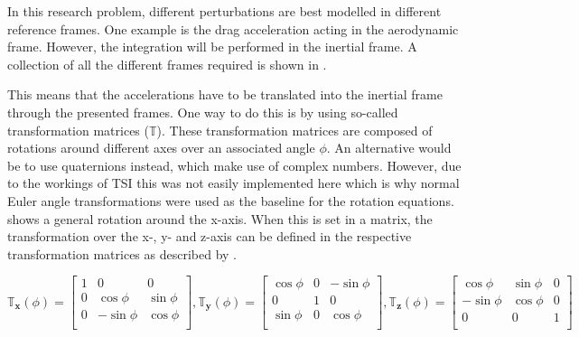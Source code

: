 In this research problem, different perturbations are best modelled in different reference frames. One example is the drag acceleration acting in the aerodynamic frame. However, the integration will be performed in the inertial frame. A collection of all the different frames required is shown in .



This means that the accelerations have to be translated into the inertial frame through the presented frames. One way to do this is by using so-called transformation matrices ($\mathbb{T}$). These transformation matrices are composed of rotations around different axes over an associated angle $\phi$. An alternative would be to use quaternions instead, which make use of complex numbers. However, due to the workings of \ac{TSI} this was not easily implemented here which is why normal Euler angle transformations were used as the baseline for the rotation equations.   shows a general rotation around the x-axis. When this is set in a matrix, the transformation over the x-, y- and z-axis can be defined in the respective transformation matrices as described by . 





\begin{equation} \label{eq:allTransMatr}
\mathbb{T}_{\mathbf{x}}(\phi)=\begin{bmatrix}
1 & 0 & 0 \\
0 & \cos\phi & \sin\phi \\
0 & -\sin\phi & \cos\phi \\
\end{bmatrix}, 
\mathbb{T}_{\mathbf{y}}(\phi)=\begin{bmatrix}
\cos\phi & 0 & -\sin\phi \\
0 & 1 & 0\\
\sin\phi & 0 & \cos\phi \\
\end{bmatrix}, 
\mathbb{T}_{\mathbf{z}}(\phi)=\begin{bmatrix}
\cos\phi & \sin\phi & 0\\
- \sin\phi & \cos\phi & 0\\
0 & 0 & 1\\
\end{bmatrix}
\end{equation}

